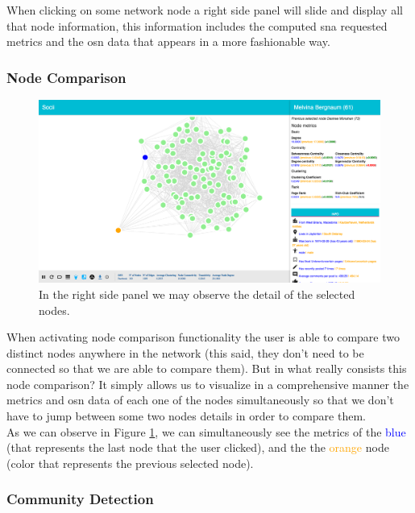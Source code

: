 When clicking on some network node a right side panel will slide and display all that node information, this information includes the computed \gls{sna} requested metrics and the \gls{osn} data that appears in a more fashionable way.

\subsubsection{Node Comparison}

\begin{figure}[h!]
\begin{center}
  \hspace*{-0.8in}
  \includegraphics[width=1.2\textwidth]{img/socii/socii_7.png}
\end{center}
\caption{\label{img:socii_7} In the right side panel we may observe the detail of the selected nodes.}
\end{figure}

When activating node comparison functionality the user is able to compare two distinct nodes anywhere in the network (this said, they don't need to be connected so that we are able to compare them). But in what really consists this node comparison? It simply allows us to visualize in a comprehensive manner the metrics and \gls{osn} data of each one of the nodes simultaneously so that we don't have to jump between some two nodes details in order to compare them.\\
\indent As we can observe in Figure \ref{img:socii_7}, we can simultaneously see the metrics of the \textcolor{blue}{blue} (that represents the last node that the user clicked), and the the \textcolor{orange}{orange} node (color that represents the previous selected node).

\subsubsection{Community Detection}

